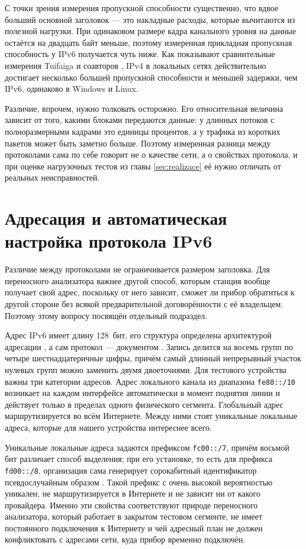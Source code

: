 С точки зрения измерения пропускной способности существенно, что вдвое больший основной заголовок — это накладные расходы, которые вычитаются из полезной нагрузки. При одинаковом размере кадра канального уровня на данные остаётся на двадцать байт меньше, поэтому измеренная прикладная пропускная способность у IPv6 получается чуть ниже. Как показывают сравнительные измерения Tuifaiga и соавторов \cite{tuifaiga2021}, IPv4 в локальных сетях действительно достигает несколько большей пропускной способности и меньшей задержки, чем IPv6, одинаково в Windows и Linux.

Различие, впрочем, нужно толковать осторожно. Его относительная величина зависит от того, какими блоками передаются данные: у длинных потоков с полноразмерными кадрами это единицы процентов, а у трафика из коротких пакетов может быть заметно больше. Поэтому измеренная разница между протоколами сама по себе говорит не о качестве сети, а о свойствах протокола, и при оценке нагрузочных тестов из главы \ref{sec:realizace} её нужно отличать от реальных неисправностей.

\section{Адресация и автоматическая настройка протокола IPv6}
\label{sec:ipv6_adresace}

Различие между протоколами не ограничивается размером заголовка. Для переносного анализатора важнее другой способ, которым станция вообще получает свой адрес, поскольку от него зависит, сможет ли прибор обратиться к другой стороне без всякой предварительной договорённости с её владельцем. Поэтому этому вопросу посвящён отдельный подраздел.

Адрес IPv6 имеет длину 128~бит, его структура определена архитектурой адресации \cite{rfc4291}, а сам протокол — документом \cite{rfc8200}. Запись делится на восемь групп по четыре шестнадцатеричные цифры, причём самый длинный непрерывный участок нулевых групп можно заменить двумя двоеточиями. Для тестового устройства важны три категории адресов. Адрес локального канала из диапазона \texttt{fe80::/10} возникает на каждом интерфейсе автоматически в момент поднятия линии и действует только в пределах одного физического сегмента. Глобальный адрес маршрутизируется во всём Интернете. Между ними стоят уникальные локальные адреса, которые для нашего устройства интереснее всего.

Уникальные локальные адреса задаются префиксом \texttt{fc00::/7}, причём восьмой бит различает способ выделения; при его установке, то есть для префикса \texttt{fd00::/8}, организация сама генерирует сорокабитный идентификатор псевдослучайным образом \cite{rfc4193}. Такой префикс с очень высокой вероятностью уникален, не маршрутизируется в Интернете и не зависит ни от какого провайдера. Именно эти свойства соответствуют природе переносного анализатора, который работает в закрытом тестовом сегменте, не имеет постоянного подключения к Интернету и чей адресный план не должен конфликтовать с адресами сети, куда прибор временно подключён.

